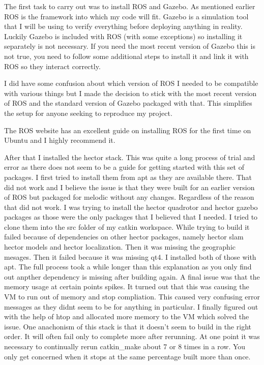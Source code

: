\documentclass[]{../resources/final_report}
\begin{document}
The first task to carry out was to install ROS and Gazebo. As mentioned earlier ROS is the framework into which my code will fit. Gazebo is a simulation tool that I will be using to verify everything before deploying anything in reality.
Luckily Gazebo is included with ROS (with some exceptions) so installing it separately is not necessary. If you need the most recent version of Gazebo this is not true, you need to follow some additional steps to install it and link it with ROS so they interact correctly.

I did have some confusion about which version of ROS I needed to be compatible with various things but I made the decision to stick with the most recent version of ROS and the standard version of Gazebo packaged with that. This simplifies the setup for anyone seeking to reproduce my project.

The ROS website\cite{melodic/installation/ubuntu} has an excellent guide on installing ROS for the first time on Ubuntu and I highly recommend it.



After that I installed the hector stack. This was quite a long process of trial and error as there does not seem to be a guide for getting started with this set of packages.
I first tried to install them from apt as they are available there. That did not work and I believe the issue is that they were built for an earlier version of ROS but packaged for melodic without any changes. Regardless of the reason that did not work. 
I was trying to install the hector quadrotor and hector gazebo packages as those were the only packages that I believed that I needed. I tried to clone them into the src folder of my catkin workspace.
While trying to build it failed because of dependencies on other hector packages, namely hector slam hector models and hector localization. Then it was missing the geographic mesages. Then it failed because it was missing qt4. I installed both of those with apt. The full process took a while longer than this explanation as you only find out anpther dependency is missing after building again.
A final issue was that the memory usage at certain points spikes. It turned out that this was causing the VM to run out of memory and stop compliation. This caused very confusing error messages as they didnt seem to be for anything in particular. I finally figured out with the help of htop and allocated more memory to the VM which solved the issue. One anachonism of this stack is that it doesn't seem to build in the right order. 
It will often fail only to complete more after rerunning. At one point it was necessary to continually rerun catkin\_make about 7 or 8 times in a row. You only get concerned when it stops at the same percentage built more than once. 
\end{document}
